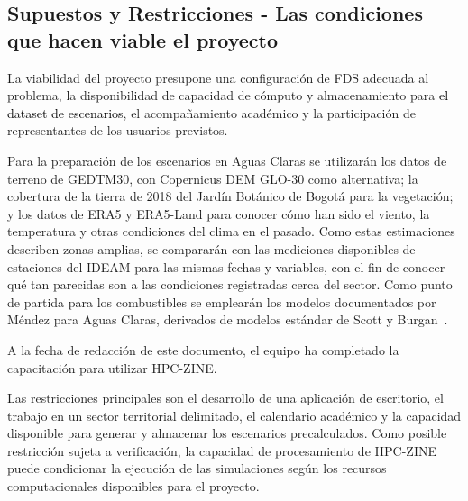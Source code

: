 \subsection{Supuestos y Restricciones - Las condiciones que hacen viable el proyecto}\label{sec:spmp-6-3}
La viabilidad del proyecto presupone una configuración de FDS adecuada al problema, la disponibilidad de capacidad de cómputo y almacenamiento para \textcolor{black}{el dataset de escenarios}, el acompañamiento académico y la participación de representantes de los usuarios previstos.

Para la preparación de los escenarios en Aguas Claras se utilizarán los datos de terreno de GEDTM30, con Copernicus DEM GLO-30 como alternativa; la cobertura de la tierra de 2018 del Jardín Botánico de Bogotá para la vegetación; y los datos de ERA5 y ERA5-Land para conocer cómo han sido el viento, la temperatura y otras condiciones del clima en el pasado. Como estas estimaciones describen zonas amplias, se compararán con las mediciones disponibles de estaciones del IDEAM para las mismas fechas y variables, con el fin de conocer qué tan parecidas son a las condiciones registradas cerca del sector. Como punto de partida para los combustibles se emplearán los modelos documentados por Méndez para Aguas Claras, derivados de modelos estándar de Scott y Burgan~\cite{vfp2026}.

A la fecha de redacción de este documento, el equipo ha completado la capacitación para utilizar HPC-ZINE.

Las restricciones principales son el desarrollo de una aplicación de escritorio, el trabajo en un sector territorial delimitado, el calendario académico y la capacidad disponible para generar y almacenar los escenarios precalculados. Como posible restricción sujeta a verificación, la capacidad de procesamiento de HPC-ZINE puede condicionar la ejecución de las simulaciones según los recursos computacionales disponibles para el proyecto.

